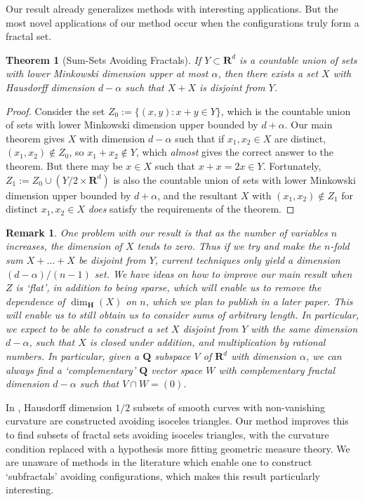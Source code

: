 \documentclass[usenames,dvipsnames]{article}
\theoremstyle{plain}
\theoremstyle{plain}
\newtheorem{theorem}{Theorem}
\newtheorem*{remark}{Remark}
\begin{document}
Our result already generalizes methods with interesting applications. But the most novel applications of our method occur when the configurations truly form a fractal set.

\begin{theorem}[Sum-Sets Avoiding Fractals]
	If $Y \subset \mathbf{R}^d$ is a countable union of sets with lower Minkowski dimension upper at most $\alpha$, then there exists a set $X$ with Hausdorff dimension $d-\alpha$ such that $X + X$ is disjoint from $Y$.
\end{theorem}
\begin{proof}
	Consider the set $Z_0 := \{ (x,y): x + y \in Y \}$, which is the countable union of sets with lower Minkowski dimension upper bounded by $d + \alpha$. Our main theorem gives $X$ with dimension $d - \alpha$ such that if $x_1,x_2 \in X$ are distinct, $(x_1,x_2) \not \in Z_0$, so $x_1 + x_2 \not \in Y$, which {\it almost} gives the correct answer to the theorem. But there may be $x \in X$ such that $x + x = 2x \in Y$. Fortunately, $Z_1 := Z_0 \cup (Y/2 \times \mathbf{R}^d)$ is also the countable union of sets with lower Minkowski dimension upper bounded by $d + \alpha$, and the resultant $X$ with $(x_1,x_2) \not \in Z_1$ for distinct $x_1,x_2 \in X$ {\it does} satisfy the requirements of the theorem.
\end{proof}

\begin{remark}
	One problem with our result is that as the number of variables $n$ increases, the dimension of $X$ tends to zero. Thus if we try and make the $n$-fold sum $X + \dots + X$ be disjoint from $Y$, current techniques only yield a dimension $(d - \alpha)/(n-1)$ set. We have ideas on how to improve our main result when $Z$ is `flat', in addition to being sparse, which will enable us to remove the dependence of $\dim_{\mathbf{H}}(X)$ on $n$, which we plan to publish in a later paper. This will enable us to still obtain us to consider sums of arbitrary length. In particular, we expect to be able to construct a set $X$ disjoint from $Y$ with the same dimension $d - \alpha$, such that $X$ is closed under addition, and multiplication by rational numbers. In particular, given a $\mathbf{Q}$ subspace $V$ of $\mathbf{R}^d$ with dimension $\alpha$, we can always find a `complementary' $\mathbf{Q}$ vector space $W$ with complementary fractal dimension $d - \alpha$ such that $V \cap W = (0)$.
\end{remark}

In \cite{MalabikaRob}, Hausdorff dimension $1/2$ subsets of smooth curves with non-vanishing curvature are constructed avoiding isoceles triangles. Our method improves this to find subsets of fractal sets avoiding isoceles triangles, with the curvature condition replaced with a hypothesis more fitting geometric measure theory. We are unaware of methods in the literature which enable one to construct `subfractals' avoiding configurations, which makes this result particularly interesting.
\end{document}

